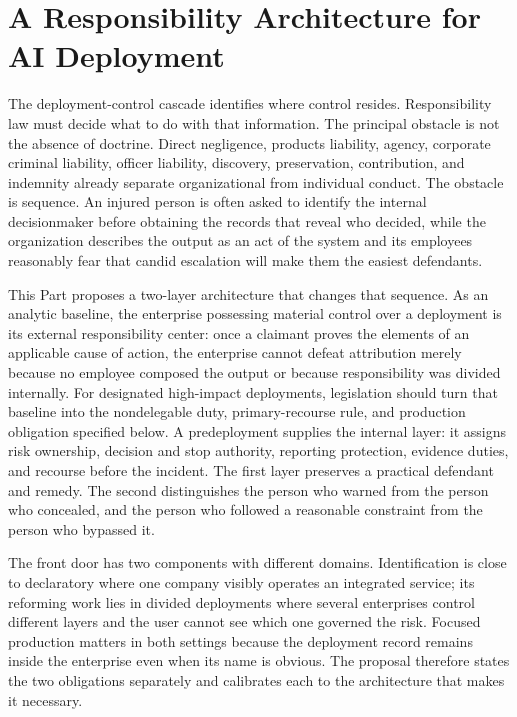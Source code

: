 \section{A Responsibility Architecture for AI Deployment}
\label{sec:responsibility}

The deployment-control cascade identifies where control resides. Responsibility law must decide what to do with that information. The principal obstacle is not the absence of doctrine. Direct negligence, products liability, agency, corporate criminal liability, officer liability, discovery, preservation, contribution, and indemnity already separate organizational from individual conduct. The obstacle is sequence. An injured person is often asked to identify the internal decisionmaker before obtaining the records that reveal who decided, while the organization describes the output as an act of the system and its employees reasonably fear that candid escalation will make them the easiest defendants.

This Part proposes a two-layer architecture that changes that sequence. As an analytic baseline, the enterprise possessing material control over a deployment is its external responsibility center: once a claimant proves the elements of an applicable cause of action, the enterprise cannot defeat attribution merely because no employee composed the output or because responsibility was divided internally. For designated high-impact deployments, legislation should turn that baseline into the nondelegable duty, primary-recourse rule, and production obligation specified below. A predeployment \Charter{} supplies the internal layer: it assigns risk ownership, decision and stop authority, reporting protection, evidence duties, and recourse before the incident. The first layer preserves a practical defendant and remedy. The second distinguishes the person who warned from the person who concealed, and the person who followed a reasonable constraint from the person who bypassed it.

The front door has two components with different domains. Identification is close to declaratory where one company visibly operates an integrated service; its reforming work lies in divided deployments where several enterprises control different layers and the user cannot see which one governed the risk. Focused production matters in both settings because the deployment record remains inside the enterprise even when its name is obvious. The proposal therefore states the two obligations separately and calibrates each to the architecture that makes it necessary.

